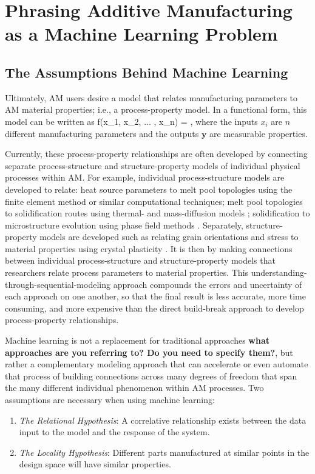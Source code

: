 \section{Phrasing Additive Manufacturing as a Machine Learning Problem}\label{phrasing}

\subsection{The Assumptions Behind Machine Learning}
Ultimately, AM users desire a model that relates manufacturing parameters to AM material properties; i.e., a process-property model. In a functional form, this model can be written as
\eqn
f(x_1, x_2, ... , x_n) = ,
\label{fundamentalgoal}
\equ
where the inputs $x_i$ are $n$ different manufacturing parameters and the outputs $\mathbf{y}$ are measurable properties. 

Currently, these process-property relationships are often developed by connecting separate process-structure and structure-property models of individual physical processes within AM. For example, individual process-structure models are developed to relate: heat source parameters to melt pool topologies \cite{Khairallah2016} using the finite element method or similar computational techniques; melt pool topologies to solidification routes using thermal- and mass-diffusion models  \cite{Tan2011}; solidification to microstructure evolution using phase field methods \cite{Kundin2015}. Separately, structure-property models are developed such as relating grain orientations and stress to material properties using crystal plasticity \cite{Pal2014}. It is then by making connections between individual process-structure and structure-property models that researchers  relate process parameters to material properties. This understanding-through-sequential-modeling approach compounds the errors and uncertainty of each approach on one another, so that the final result is less accurate, more time consuming, and more expensive than the direct build-break approach to develop process-property relationships.

Machine learning is not a replacement for traditional approaches \textbf{what approaches are you referring to? Do you need to specify them?}, but rather a complementary modeling approach that can accelerate or even automate that process of building connections across many degrees of freedom that span the many different individual phenomenon within AM processes. Two assumptions are necessary when using machine learning:
\begin{enumerate}
\item \textit{The Relational Hypothesis}: A correlative relationship exists between the data input to the model and the response of the system.
\item \textit{The Locality Hypothesis}: Different parts manufactured at similar points in the design space will have similar properties.
\end{enumerate}

